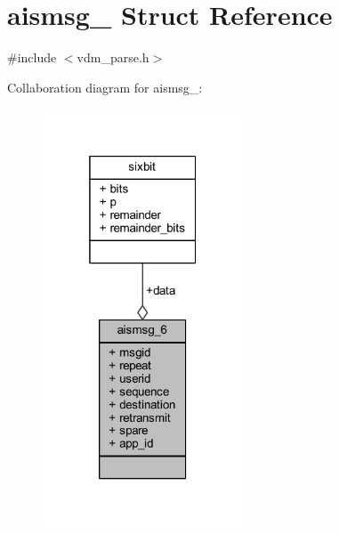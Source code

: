 \hypertarget{structaismsg__6}{}\section{aismsg\+\_ Struct Reference}
\label{structaismsg__6}


{\ttfamily \#include $<$vdm\+\_\+parse.\+h$>$}



Collaboration diagram for aismsg\+\_\+:
\nopagebreak
\begin{figure}[H]
\begin{center}
\leavevmode
\includegraphics[width=169pt]{structaismsg__6__coll__graph}
\end{center}
\end{figure}
